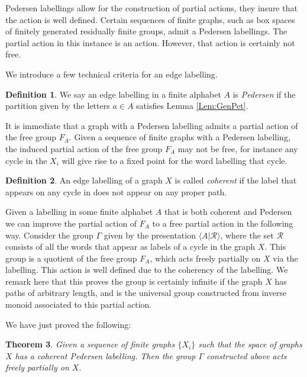 \documentclass[11pt,a4paper]{amsart}
\theoremstyle{plain}
\newtheorem{theorem}{Theorem}%
\theoremstyle{definition}%
\newtheorem{definition}[theorem]{Definition}%
\theoremstyle{remark}%
\begin{document}
Pedersen labellings allow for the construction of partial actions, they insure that the action is well defined. Certain sequences of finite graphs, such as box spaces of finitely generated residually finite groups, admit a Pedersen labellings. The partial action in this instance is an action. However, that action is certainly not free.

We introduce a few technical criteria for an edge labelling.

\begin{definition}
We say an edge labelling in a finite alphabet $A$ is \textit{Pedersen} if the partition given by the letters $a \in A$ satisfies Lemma \ref{Lem:GenPet}.
\end{definition}

It is immediate that a graph with a Pedersen labelling admits a partial action of the free group $F_{A}$. Given a sequence of finite graphs with a Pedersen labelling, the induced partial action of the free group $F_{A}$ may not be free, for instance any cycle in the $X_{i}$ will give rise to a fixed point for the word labelling that cycle.

\begin{definition}
An edge labelling of a graph $X$ is called \textit{coherent} if the label that appears on any cycle in does not appear on any proper path.
\end{definition}

Given a labelling in some finite alphabet $A$ that is both coherent and Pedersen  we can improve the partial action of $F_{A}$ to a free partial action in the following way. Consider the group $\Gamma$ given by the presentation $\langle A | \mathcal{R} \rangle$, where the set $\mathcal{R}$ consists of all the words that appear as labels of a cycle in the graph $X$. This group is a quotient of the free group $F_{A}$, which acts freely partially on $X$ via the labelling. This action is well defined due to the coherency of the labelling. We remark here that this proves the group is certainly infinite if the graph $X$ has paths of arbitrary length, and is the universal group constructed from inverse monoid associated to this partial action.

We have just proved the following:

\begin{theorem}
Given a sequence of finite graphs $\lbrace X_{i} \rbrace$ such that the space of graphs $X$ has a coherent Pedersen labelling. Then the group $\Gamma$ constructed above acts freely partially on $X$.
\end{theorem}
\end{document}
